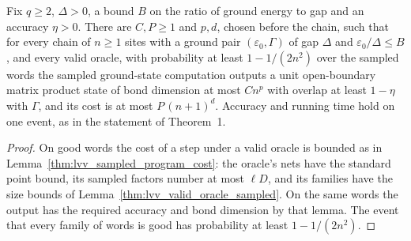 \begin{theorem}
    \label{thm:lvv_sampled_theorem_one_valid}
    \leanok
    Fix $q\ge2$, $\Delta>0$, a bound $B$ on the ratio of ground energy to gap and
    an accuracy $\eta>0$. There are $C,P\ge1$ and $p,d$, chosen before the chain,
    such that for every chain of $n\ge1$ sites with a ground pair
    $(\varepsilon_0,\Gamma)$ of gap $\Delta$ and $\varepsilon_0/\Delta\le B$, and
    every valid oracle, with probability at least $1-1/(2n^2)$ over the sampled
    words the sampled ground-state computation outputs a unit open-boundary
    matrix product state of bond dimension at most $Cn^{p}$ with overlap at least
    $1-\eta$ with $\Gamma$, and its cost is at most $P\,(n+1)^d$. Accuracy and
    running time hold on one event, as in the statement of Theorem~1.
\end{theorem}
\begin{proof}
    \leanok
    On good words the cost of a step under a valid oracle is bounded as in
    Lemma~\ref{thm:lvv_sampled_program_cost}: the oracle's nets have the standard
    point bound, its sampled factors number at most $\ell D$, and its families
    have the size bounds of Lemma~\ref{thm:lvv_valid_oracle_sampled}. On the same
    words the output has the required accuracy and bond dimension by that lemma.
    The event that every family of words is good has probability at least
    $1-1/(2n^2)$.
\end{proof}
